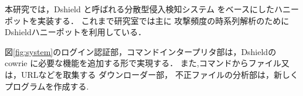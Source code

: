 \documentclass{entry}
\begin{document}



本研究では，Dshield
と呼ばれる分散型侵入検知システム
をベースにしたハニーポットを実装する．
これまで研究室では主に
攻撃頻度の時系列解析のために
Dshieldハニーポットを利用している\cite{nishida2022}．

図\ref{fig:system}のログイン認証部，コマンドインタープリタ部は，Dshieldの
cowrie に必要な機能を追加する形で実現する．
また,コマンドからファイル又は，URLなどを取集する
ダウンローダー部，
不正ファイルの分析部は，新しく
プログラムを作成する.
\end{document}

